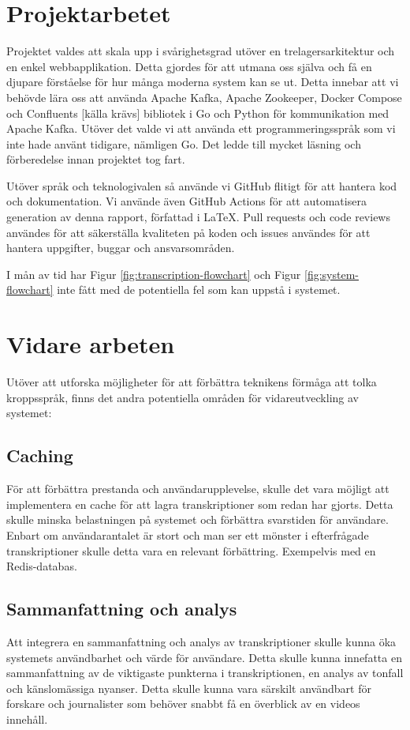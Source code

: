 \section{Projektarbetet}
Projektet valdes att skala upp i svårighetsgrad utöver en trelagersarkitektur
och en enkel webbapplikation. Detta gjordes för att utmana oss själva och
få en djupare förståelse för hur många moderna system kan se ut. Detta
innebar att vi behövde lära oss att använda Apache Kafka, Apache Zookeeper,
Docker Compose och Confluents [källa krävs] bibliotek i Go och Python för
kommunikation med Apache Kafka. Utöver det valde vi att använda ett
programmeringsspråk som vi inte hade använt tidigare, nämligen Go. Det ledde
till mycket läsning och förberedelse innan projektet tog fart. 

Utöver språk och teknologivalen så använde vi GitHub flitigt för att
hantera kod och dokumentation. Vi använde även GitHub Actions för att
automatisera generation av denna rapport, författad i \LaTeX. Pull requests
och code reviews användes för att säkerställa kvaliteten på koden och issues
användes för att hantera uppgifter, buggar och ansvarsområden.

I mån av tid har Figur \ref{fig:transcription-flowchart} och Figur 
\ref{fig:system-flowchart} inte fått med de potentiella fel som kan uppstå
i systemet. 

\section{Vidare arbeten}
Utöver att utforska möjligheter för att förbättra teknikens förmåga att tolka
kroppsspråk, finns det andra potentiella områden för vidareutveckling av
systemet:

\subsection{Caching}
För att förbättra prestanda och användarupplevelse, skulle det vara möjligt
att implementera en cache för att lagra transkriptioner som redan har gjorts.
Detta skulle minska belastningen på systemet och förbättra svarstiden för
användare. Enbart om användarantalet är stort och man ser ett mönster i
efterfrågade transkriptioner skulle detta vara en relevant förbättring. 
Exempelvis med en Redis-databas. 

\subsection{Sammanfattning och analys}
Att integrera en sammanfattning och analys av transkriptioner skulle kunna
öka systemets användbarhet och värde för användare. Detta skulle kunna
innefatta en sammanfattning av de viktigaste punkterna i transkriptionen, en
analys av tonfall och känslomässiga nyanser. Detta skulle kunna vara särskilt
användbart för forskare och journalister som behöver snabbt få en överblick av
en videos innehåll.

